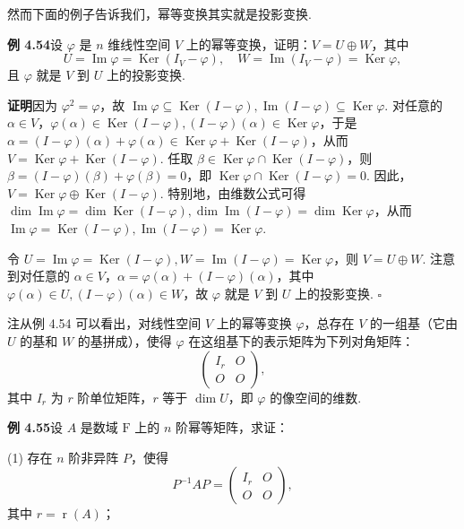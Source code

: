 \documentclass[UTF8, 12pt, fontset=fandol, oneside]{ctexart}
\begin{document}
然而下面的例子告诉我们，幂等变换其实就是投影变换.

\noindent\textbf{例 4.54}\quad 设 $\varphi$ 是 $n$ 维线性空间 $V$ 上的幂等变换，证明：$V=U\oplus W$，其中
\[
U=\operatorname{Im}\varphi=\operatorname{Ker}(I_V-\varphi),\quad
W=\operatorname{Im}(I_V-\varphi)=\operatorname{Ker}\varphi,
\]
且 $\varphi$ 就是 $V$ 到 $U$ 上的投影变换.

\noindent\textbf{证明}\quad 因为 $\varphi^2=\varphi$，故 $\operatorname{Im}\varphi\subseteq\operatorname{Ker}(I-\varphi),\operatorname{Im}(I-\varphi)\subseteq\operatorname{Ker}\varphi$. 对任意的 $\alpha\in V$，$\varphi(\alpha)\in\operatorname{Ker}(I-\varphi),(I-\varphi)(\alpha)\in\operatorname{Ker}\varphi$，于是 $\alpha=(I-\varphi)(\alpha)+\varphi(\alpha)\in\operatorname{Ker}\varphi+\operatorname{Ker}(I-\varphi)$，从而 $V=\operatorname{Ker}\varphi+\operatorname{Ker}(I-\varphi)$. 任取 $\beta\in\operatorname{Ker}\varphi\cap\operatorname{Ker}(I-\varphi)$，则 $\beta=(I-\varphi)(\beta)+\varphi(\beta)=0$，即 $\operatorname{Ker}\varphi\cap\operatorname{Ker}(I-\varphi)=0$. 因此，$V=\operatorname{Ker}\varphi\oplus\operatorname{Ker}(I-\varphi)$. 特别地，由维数公式可得 $\dim\operatorname{Im}\varphi=\dim\operatorname{Ker}(I-\varphi),\dim\operatorname{Im}(I-\varphi)=\dim\operatorname{Ker}\varphi$，从而 $\operatorname{Im}\varphi=\operatorname{Ker}(I-\varphi),\operatorname{Im}(I-\varphi)=\operatorname{Ker}\varphi$.

令 $U=\operatorname{Im}\varphi=\operatorname{Ker}(I-\varphi),W=\operatorname{Im}(I-\varphi)=\operatorname{Ker}\varphi$，则 $V=U\oplus W$. 注意到对任意的 $\alpha\in V$，$\alpha=\varphi(\alpha)+(I-\varphi)(\alpha)$，其中 $\varphi(\alpha)\in U,(I-\varphi)(\alpha)\in W$，故 $\varphi$ 就是 $V$ 到 $U$ 上的投影变换. $\square$

注\quad 从例 4.54 可以看出，对线性空间 $V$ 上的幂等变换 $\varphi$，总存在 $V$ 的一组基（它由 $U$ 的基和 $W$ 的基拼成），使得 $\varphi$ 在这组基下的表示矩阵为下列对角矩阵：
\[
\left(\begin{array}{cc}
I_r & O\\
O & O
\end{array}\right),
\]
其中 $I_r$ 为 $r$ 阶单位矩阵，$r$ 等于 $\dim U$，即 $\varphi$ 的像空间的维数.

\noindent\textbf{例 4.55}\quad 设 $A$ 是数域 $\mathrm{F}$ 上的 $n$ 阶幂等矩阵，求证：

(1) 存在 $n$ 阶非异阵 $P$，使得
\[
P^{-1}AP=\left(\begin{array}{cc}
I_r & O\\
O & O
\end{array}\right),
\]
其中 $r=\operatorname{r}(A)$；
\end{document}
